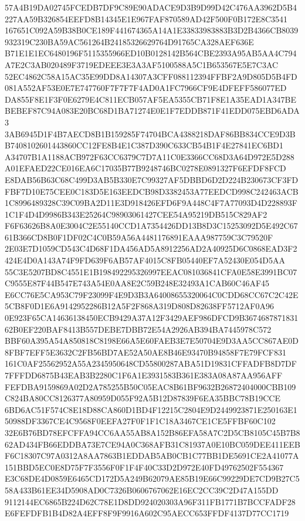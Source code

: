 \documentclass[UTF8,fontset=fandol,zihao=-4,a4paper]{ctexart}
\begin{document}
{{57A4B19DA02745FCEDB7DF9C89E90ADACE9D3B9D99D42C476AA3962D5B4227AA59B326854EEFD8B14345E1E967FAF870589AD42F500F0B172E8C3541
167651C092A59B38B0CE189F441674365A14A1E33833983883B3D2B4366CB8039932319C230BA59AC561264B24185326629764D91765CA328AEF636E
B71E1E1EC6480196F5115355966ED10B0128142B564CBE2393A95AB5AA4C794A7E2C3AB020489F3719EDEEE3E3A3AF5100588A5C1B653567E5E7C3AC
52EC4862C58A15AC35E99DD8A14307A3CFF088112394FFBF2A9D805D5B4FD081A552AF53E0E7E747760F7F7F7F4AD0A1FC7966CF9E4DFEFF586077ED
DA855F8E1F3F0E6279E4C811ECB057AF5EA5355CB71F8E1A35EAD1A347BEBEBEF87C94A083E20BC68D1BA71274E0E1F7EDDB871F41EDD075EBD6ADA3
3AB6945D1F4B7AECD8B1B159285F74704BCA4388218DAF86BB834CCE9D3BB7408102601443860CC12FE8B4E1C387D390C633CB54B1F4E27841EC6BD1
A34707B1A1188ACB972F63CC6379C7D7A11C0E3366CC68D3A64D972E5D288A01EFAED22CE016EA6C17035B77B9248746BC0278E0891327F6EFDF8FCD
E8DAB56B63C68C499D3AB5B330E7C99327AF5DBBD6D2D224B230673CF3FDFBF7D10E75CEE0C183D5E163EEDCB98D3382453A77EEDCD998C242463ACB
1C8996489328C39C09BA2D11E3D918426EFD6F9A448C4F7A77093D4D228893F1C1F4D4D9986B343E25264C98903061427CEE54A95219DB515C829AF2
F6F63626B8A0E3004C2E55140CCD1A7354426DD13B8D3C15253092D5E492C6761B366CD8B0F1DF02C4C0B59A56A4481176891EAAA987759C3C79520F
2E03E7D1059CD543C4D68F1DA456AD5A8912256AD2A40925D6C0868EAD3F2424E4D0A143A74F9FD639F6AB57AF4015C8FB05440EF7A52430E054D5AA
55C3E5207BD8C4551E1B198492295326997EEAC081036841CFA0E58E3991BC07C9555E87F44B547E743A54E0AA8E2C59B248E32493A1CAB60C46AF45
E6CC76E5CA953C79F23099F4E9D3B3A64008655320064C0CDD68CC67C2C42E5CB8F0D1E6A9142952286B12A5F2F868A319D808D82638FF5712AF0A96
0E923F65CA14636138450ECB9429A37A12F3429AEF986DFCD9B367468787183162B0EF220BAF8413B557DEBE7DBB72E54A2926AB394BA7445978C572
BBF60A395A54A850818C8198E66A5E60FAEB3E7E50704E9D3AA5CC867AE0D8FBF7EFF5E3632C2FB56BD7AE52A50AE8B46E93470B94858F7E79FCF831
161C0AF25562952A55A2345950648CD55800287ABA51D19831CFFADFB8D7DF7FFFDD6875B43EAB3B2280C1F6A1E3931583B361E383A08A87AA956AFF
FEFDBA9159869A02D2A785255B50C05EAC8B61BF9632B26872404000CBB109C824BA80CC8126377A80959D055F92A5B12D87839F6EA35BBC78B19CCE
6BD6AC51F574C8E18D88CA860D1BD4F12215C2804E9D2449923871E250163E150988DF3367CE4C9568F0EEFA27F0F1F1C18A3467CE1CE5FFBF60C102
32E6B76BD78EFCFFA94CC6AA55AB8A152B86EFA58A7C2D5CB8105C45B7B862AD434FB66EDDBA73E7CE94A0C368AFB31C81937A0E10BC059DEE411EEB
F6C18307C97A0312A8AA7863B1EDDAB5AB0CB1C77BB1DE5691CE2A41077A151BBD5EC0E8D75F7F3556F0F1F4F40C33D2D972E40FD49762502F554367
E3C68DE4D0859E6465CD172D5A249B62079AE85B19E66C99229DE7CD9B27C558A433B61EE34D5908AD0C7326B0606767062E16EC2CC39C2D47A155DD
9112144EC6865B224D62C78E1D8DD924020303A96F311FB1771B7BCCFADF28E6FEFDFB1B4D82A4EFF8F9F9916A602C95AECC653FFDF4137D77CC1719
}}
\end{document}
